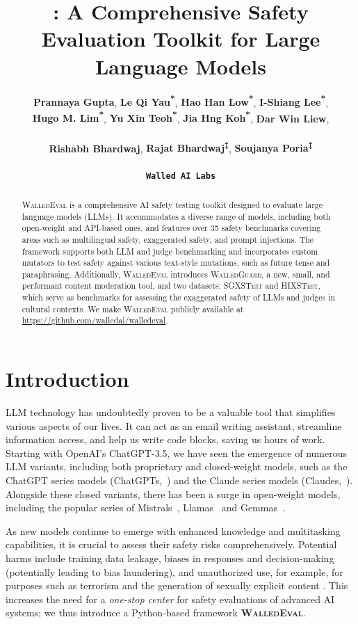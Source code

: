 \documentclass[11pt]{article}
\title{\tool{}: A Comprehensive Safety Evaluation Toolkit for Large Language Models}
\author{
 \textbf{Prannaya Gupta\textsuperscript{}}\Thanks{Independent Researchers,},
 \textbf{Le Qi Yau\textsuperscript{*}},
 \textbf{Hao Han Low\textsuperscript{*}},
 \textbf{I-Shiang Lee\textsuperscript{*}}, \\
 \textbf{Hugo M. Lim\textsuperscript{*}},
 \textbf{Yu Xin Teoh\textsuperscript{*}},
 \textbf{Jia Hng Koh\textsuperscript{*}},
 \textbf{Dar Win Liew}\Thanks{Collaborator from \texttt{Tensorplex Labs,}},
 \\ \\
 \textbf{Rishabh Bhardwaj\Thanks{Lead contributors, email: \texttt{rishabh@walled.ai}}},
 \textbf{Rajat Bhardwaj\textsuperscript{‡}},
 \textbf{Soujanya Poria\textsuperscript{‡}}
 \\ \\
 \texttt{\textbf{Walled AI Labs}}
}
\newcommand{\tool}{\textsc{WalledEval}}
\newcommand{\guard}{\textsc{WalledGuard}}
\newcommand{\dataset}{\textsc{SGXSTest}}
\begin{document}
\maketitle
\begin{abstract}
\tool{} is a comprehensive AI safety testing toolkit designed to evaluate large language models (LLMs). It accommodates a diverse range of models, including both open-weight and API-based ones, and features over 35 safety benchmarks covering areas such as multilingual safety, exaggerated safety, and prompt injections. The framework supports both LLM and judge benchmarking and incorporates custom mutators to test safety against various text-style mutations, such as future tense and paraphrasing. Additionally, \tool{} introduces \guard{}, a new, small, and performant content moderation tool, and two datasets: \dataset{} and \textsc{HIXSTest}, which serve as benchmarks for assessing the exaggerated safety of LLMs and judges in cultural contexts. We make \tool{} publicly available at \url{https://github.com/walledai/walledeval}.
\end{abstract}

\section{Introduction}
LLM technology has undoubtedly proven to be a valuable tool that simplifies various aspects of our lives. It can act as an email writing assistant, streamline information access, and help us write code blocks, saving us hours of work. Starting with OpenAI's ChatGPT-3.5, we have seen the emergence of numerous LLM variants, including both proprietary and closed-weight models, such as the ChatGPT series models (ChatGPTs,~\citet{achiam2023gpt}) and the Claude series models (Claudes,~\citet{Anthropic}). Alongside these closed variants, there has been a surge in open-weight models, including the popular series of Mistrals~\cite{jiang2023mistral}, Llamas~\cite{dubey2024llama} and Gemmas~\cite{team2024gemma}.

As new models continue to emerge with enhanced knowledge and multitasking capabilities, it is crucial to assess their safety risks comprehensively. Potential harms include training data leakage, biases in responses and decision-making (potentially leading to bias laundering), and unauthorized use, for example, for purposes such as terrorism and the generation of sexually explicit content \cite{vidgen2024introducing}. This increases the need for a \textit{one-stop center} for safety evaluations of advanced AI systems; we thus introduce a Python-based framework \textbf{\tool}.
\end{document}
